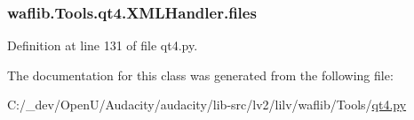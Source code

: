 \subsubsection[{\texorpdfstring{files}{files}}]{\setlength{\rightskip}{0pt plus 5cm}waflib.\+Tools.\+qt4.\+X\+M\+L\+Handler.\+files}\hypertarget{classwaflib_1_1_tools_1_1qt4_1_1_x_m_l_handler_a1f0071e960728156e3c13be1e82c48f8}{}\label{classwaflib_1_1_tools_1_1qt4_1_1_x_m_l_handler_a1f0071e960728156e3c13be1e82c48f8}


Definition at line 131 of file qt4.\+py.



The documentation for this class was generated from the following file\+:\begin{DoxyCompactItemize}
\item 
C\+:/\+\_\+dev/\+Open\+U/\+Audacity/audacity/lib-\/src/lv2/lilv/waflib/\+Tools/\hyperlink{lilv_2waflib_2_tools_2qt4_8py}{qt4.\+py}\end{DoxyCompactItemize}
